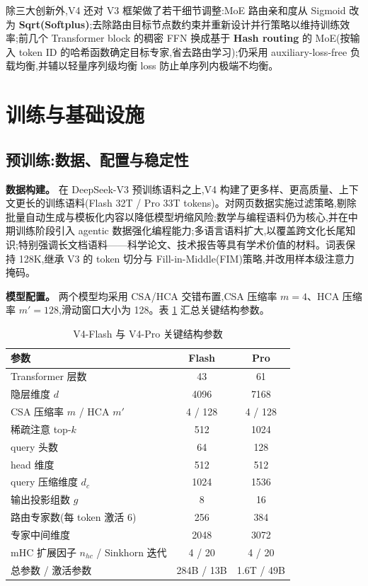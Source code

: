 \documentclass{MathNoteCN}
\begin{document}
除三大创新外,V4 还对 V3 框架做了若干细节调整:MoE 路由亲和度从 Sigmoid 改为 \textbf{Sqrt(Softplus)};去除路由目标节点数约束并重新设计并行策略以维持训练效率;前几个 Transformer block 的稠密 FFN 换成基于 \textbf{Hash routing} 的 MoE(按输入 token ID 的哈希函数确定目标专家,省去路由学习);仍采用 auxiliary-loss-free 负载均衡,并辅以轻量序列级均衡 loss 防止单序列内极端不均衡。

\section{训练与基础设施}

\subsection{预训练:数据、配置与稳定性}

\textbf{数据构建。} 在 DeepSeek-V3 预训练语料之上,V4 构建了更多样、更高质量、上下文更长的训练语料(Flash 32T / Pro 33T tokens)\cite{arxiv}。对网页数据实施过滤策略,剔除批量自动生成与模板化内容以降低模型坍缩风险;数学与编程语料仍为核心,并在中期训练阶段引入 agentic 数据强化编程能力;多语言语料扩大,以覆盖跨文化长尾知识;特别强调长文档语料——科学论文、技术报告等具有学术价值的材料。词表保持 128K,继承 V3 的 token 切分与 Fill-in-Middle(FIM)策略,并改用样本级注意力掩码。

\textbf{模型配置。} 两个模型均采用 CSA/HCA 交错布置,CSA 压缩率 $m{=}4$、HCA 压缩率 $m'{=}128$,滑动窗口大小为 128。表 \ref{tab:modelcfg} 汇总关键结构参数。

\begin{table}[h]
\centering
\caption{V4-Flash 与 V4-Pro 关键结构参数\cite{arxiv}}
\label{tab:modelcfg}
\begin{tabular}{lcc}
\hline
参数 & Flash & Pro \\
\hline
Transformer 层数 & 43 & 61 \\
隐层维度 $d$ & 4096 & 7168 \\
CSA 压缩率 $m$ / HCA $m'$ & 4 / 128 & 4 / 128 \\
稀疏注意 top-$k$ & 512 & 1024 \\
query 头数 & 64 & 128 \\
head 维度 & 512 & 512 \\
query 压缩维度 $d_c$ & 1024 & 1536 \\
输出投影组数 $g$ & 8 & 16 \\
路由专家数(每 token 激活 6) & 256 & 384 \\
专家中间维度 & 2048 & 3072 \\
mHC 扩展因子 $n_{hc}$ / Sinkhorn 迭代 & 4 / 20 & 4 / 20 \\
总参数 / 激活参数 & 284B / 13B & 1.6T / 49B \\
\hline
\end{tabular}
\end{table}
\end{document}
